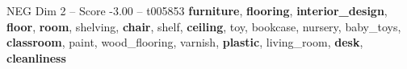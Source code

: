\begin{textsample}{NEG Dim 2 – Score -3.00 – t005853}  \label{ex:f2_neg_035}
\textbf{furniture}, \textbf{flooring}, \textbf{interior\_design}, \textbf{floor}, \textbf{room}, shelving, \textbf{chair}, shelf, \textbf{ceiling}, toy, bookcase, nursery, baby\_toys, \textbf{classroom}, paint, wood\_flooring, varnish, \textbf{plastic}, living\_room, \textbf{desk}, \textbf{cleanliness}

\end{textsample}
